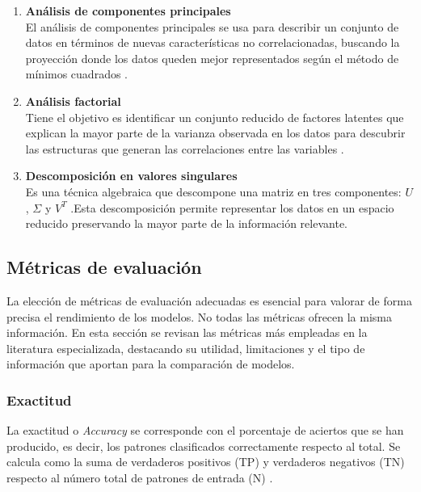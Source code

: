 \begin{enumerate}
	\item \textbf{Análisis de componentes principales} \\
		El análisis de componentes principales se usa para describir un conjunto de datos en términos de nuevas características no correlacionadas, buscando la proyección donde los datos queden mejor representados según el método de mínimos cuadrados \cite{pca}.

	\item \textbf{Análisis factorial} \\
		Tiene el objetivo es identificar un conjunto reducido de factores latentes que explican la mayor parte de la varianza observada en los datos para descubrir las estructuras que generan las correlaciones entre las variables \cite{fa}.

	\item \textbf{Descomposición en valores singulares} \\
		Es una técnica algebraica que descompone una matriz en tres componentes: $U$, $\Sigma$ y $V^T$ \cite{dvs}.Esta descomposición permite representar los datos en un espacio reducido preservando la mayor parte de la información relevante.
\end{enumerate}

\subsection{Métricas de evaluación}
\label{subsec:2_metricas}

La elección de métricas de evaluación adecuadas es esencial para valorar de forma precisa el rendimiento de los modelos. No todas las métricas ofrecen la misma información. En esta sección se revisan las métricas más empleadas en la literatura especializada, destacando su utilidad, limitaciones y el tipo de información que aportan para la comparación de modelos.

\subsubsection{Exactitud}
\label{subsubsec:acc}

La exactitud o \textit{Accuracy} se corresponde con el porcentaje de aciertos que se han producido, es decir, los patrones clasificados correctamente respecto al total. Se calcula como la suma de verdaderos positivos (TP) y verdaderos negativos (TN) respecto al número total de patrones de entrada (N) \cite{metrics}.

